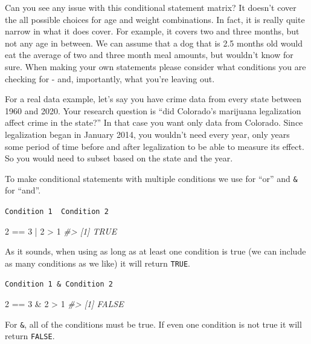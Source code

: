 \documentclass[
]{krantz}
\makeatletter
\newenvironment{Shaded}{\begin{snugshade}}{\end{snugshade}}
\newcommand{\CommentTok}[1]{\textcolor[rgb]{0.37,0.37,0.37}{\textit{#1}}}
\newcommand{\DecValTok}[1]{\textcolor[rgb]{0.06,0.06,0.06}{#1}}
\newcommand{\SpecialCharTok}[1]{\textcolor[rgb]{0,0,0}{#1}}
\newenvironment{kframe}{%
\medskip{}
\setlength{\fboxsep}{.8em}
 \def\at@end@of@kframe{}%
 \ifinner\ifhmode%
  \def\at@end@of@kframe{\end{minipage}}%
  \begin{minipage}{\columnwidth}%
 \fi\fi%
 \def\FrameCommand##1{\hskip\@totalleftmargin \hskip-\fboxsep
 \colorbox{shadecolor}{##1}\hskip-\fboxsep
     \hskip-\linewidth \hskip-\@totalleftmargin \hskip\columnwidth}%
 \MakeFramed {\advance\hsize-\width
   \@totalleftmargin\z@ \linewidth\hsize
   \@setminipage}}%
 {\par\unskip\endMakeFramed%
 \at@end@of@kframe}
\renewenvironment{Shaded}{\begin{kframe}}{\end{kframe}}
\makeatother
\begin{document}
Can you see any issue with this conditional statement
matrix? It doesn't cover the all possible choices for age
and weight combinations. In fact, it is really quite narrow
in what it does cover. For example, it covers two and three
months, but not any age in between. We can assume that a dog
that is 2.5 months old would eat the average of two and
three month meal amounts, but wouldn't know for sure. When
making your own statements please consider what conditions
you are checking for - and, importantly, what you're leaving
out.

For a real data example, let's say you have crime data from
every state between 1960 and 2020. Your research question is
``did Colorado's marijuana legalization affect crime in the
state?'' In that case you want only data from Colorado.
Since legalization began in January 2014, you wouldn't need
every year, only years some period of time before and after
legalization to be able to measure its effect. So you would
need to subset based on the state and the year.

To make conditional statements with multiple conditions we
use \texttt{\textbar{}} for ``or'' and \texttt{\&} for
``and''.

\texttt{Condition\ 1\ \textbar{}\ Condition\ 2}

\begin{Shaded}
\begin{Highlighting}[]
\DecValTok{2} \SpecialCharTok{==} \DecValTok{3} \SpecialCharTok{|} \DecValTok{2} \SpecialCharTok{\textgreater{}} \DecValTok{1}
\CommentTok{\#\textgreater{} [1] TRUE}
\end{Highlighting}
\end{Shaded}

As it sounds, when using \texttt{\textbar{}} as long as at
least one condition is true (we can include as many
conditions as we like) it will return \texttt{TRUE}.

\texttt{Condition\ 1\ \&\ Condition\ 2}

\begin{Shaded}
\begin{Highlighting}[]
\DecValTok{2} \SpecialCharTok{==} \DecValTok{3} \SpecialCharTok{\&} \DecValTok{2} \SpecialCharTok{\textgreater{}} \DecValTok{1}
\CommentTok{\#\textgreater{} [1] FALSE}
\end{Highlighting}
\end{Shaded}

For \texttt{\&}, all of the conditions must be true. If even
one condition is not true it will return \texttt{FALSE}.
\end{document}
